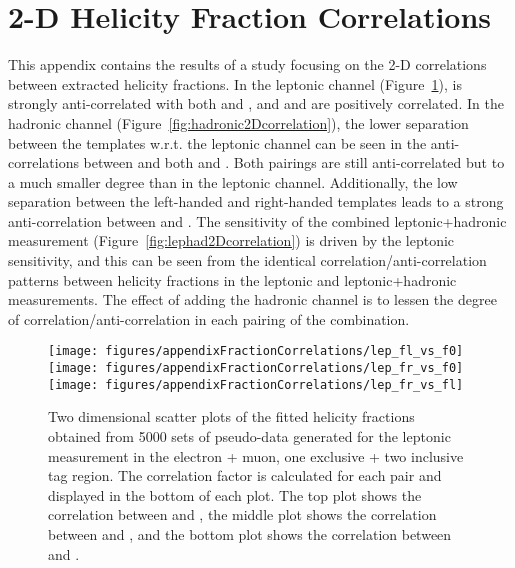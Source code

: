 \clearpage
\section{2-D Helicity Fraction Correlations}
\label{app:fractionCorrelations}
This appendix contains the results of a study focusing on the 2-D correlations between extracted helicity fractions. In the leptonic channel (Figure~\ref{fig:leptonic2Dcorrelation}), \fo is strongly anti-correlated with both \fl and \fr, and \fl and \fr are positively correlated. In the hadronic channel (Figure~\ref{fig:hadronic2Dcorrelation}), the lower separation between the templates w.r.t. the leptonic channel can be seen in the anti-correlations between \fo and both \fl and \fr. Both pairings are still anti-correlated but to a much smaller degree than in the leptonic channel. Additionally, the low separation between the left-handed and right-handed templates leads to a strong anti-correlation between \fl and \fr. The sensitivity of the combined leptonic+hadronic measurement (Figure~\ref{fig:lephad2Dcorrelation}) is driven by the leptonic sensitivity, and this can be seen from the identical correlation/anti-correlation patterns between helicity fractions in the leptonic and leptonic+hadronic measurements. The effect of adding the hadronic channel is to lessen the degree of correlation/anti-correlation in each pairing of the combination.

\begin{figure}[!hb]
\begin{center}
        \texttt{[image: figures/appendixFractionCorrelations/lep\_fl\_vs\_f0]}\\
        \texttt{[image: figures/appendixFractionCorrelations/lep\_fr\_vs\_f0]}\\
        \texttt{[image: figures/appendixFractionCorrelations/lep\_fr\_vs\_fl]}
        
\caption{Two dimensional scatter plots of the fitted helicity fractions obtained from 5000 sets of pseudo-data generated for the leptonic measurement in the electron + muon, one exclusive + two inclusive \bt tag region. The correlation factor is calculated for each pair and displayed in the bottom of each plot. The top plot shows the correlation between \fo and \fl, the middle plot shows the correlation between \fo and \fr, and the bottom plot shows the correlation between \fl and \fr.}
\label{fig:leptonic2Dcorrelation}
\end{center}
\end{figure}


